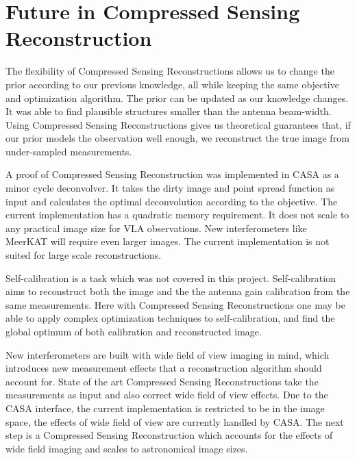 \section{Future in Compressed Sensing Reconstruction}
The flexibility of Compressed Sensing Reconstructions allows us to change the prior according to our previous knowledge, all while keeping the same objective and optimization algorithm. The prior can be updated as our knowledge changes. It was able to find plausible structures smaller than the antenna beam-width. Using Compressed Sensing Reconstructions gives us theoretical guarantees that,  if our prior models the observation well enough, we reconstruct the true image from under-sampled measurements.


A proof of Compressed Sensing Reconstruction was implemented in CASA as a minor cycle deconvolver. It takes the dirty image and point spread function as input and calculates the optimal deconvolution according to the objective. The current implementation has a quadratic memory requirement. It does not scale to any practical image size for VLA observations. New interferometers like MeerKAT will require even larger images. The current implementation is not suited for large scale reconstructions. 

Self-calibration is a task which was not covered in this project. Self-calibration aims to reconstruct both the image and the the antenna gain calibration from the same measurements. Here with Compressed Sensing Reconstructions one may be able to apply complex optimization techniques to self-calibration, and find the global optimum of both calibration and reconstructed image.

New interferometers are built with wide field of view imaging in mind, which introduces new measurement effects that a reconstruction algorithm should account for. State of the art Compressed Sensing Reconstructions take the measurements as input and also correct wide field of view effects. Due to the CASA interface, the current implementation is restricted to be in the image space, the effects of wide field of view are currently handled by CASA. The next step is a Compressed Sensing Reconstruction which accounts for the effects of wide field imaging and scales to astronomical image sizes.